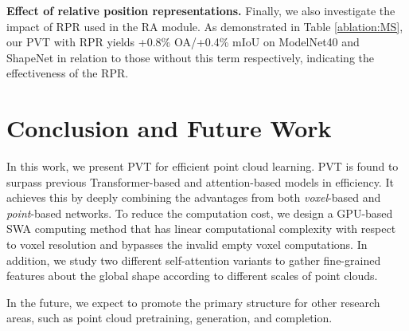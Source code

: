 \documentclass[10pt,twocolumn,letterpaper]{article}
\begin{document}
\textbf{Effect of relative position representations.} Finally, we also investigate the impact of RPR used in the RA module. As demonstrated in Table \ref{ablation:MS}, our PVT with RPR yields +0.8\% OA/+0.4\% mIoU on ModelNet40 and ShapeNet in relation to those without this term respectively, indicating the effectiveness of the RPR.


\section{Conclusion and Future Work}
In this work, we present PVT for efficient point cloud learning.
PVT is found to surpass previous Transformer-based and attention-based models in efficiency. It achieves this by deeply combining the advantages from both \emph{voxel}-based and \emph{point}-based networks. To reduce the computation cost, we design a GPU-based SWA computing method that has linear computational complexity with respect to voxel resolution and bypasses the invalid empty voxel computations. In addition, 
we study two different self-attention variants to gather fine-grained features about the global shape according to different scales of point clouds.

In the future, we expect to promote the primary structure for other research areas, such as point cloud pretraining, generation, and completion.




{\small


}
\end{document}

